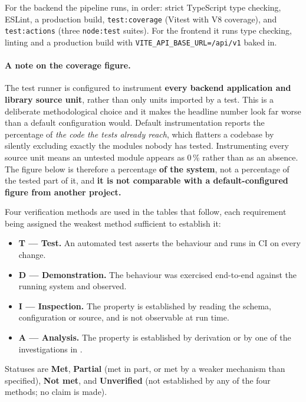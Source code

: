 For the backend the pipeline runs, in order: strict TypeScript type checking,
ESLint, a production build, \texttt{test:coverage} (Vitest with V8 coverage),
and \texttt{test:actions} (three \texttt{node:test} suites). For the frontend it
runs type checking, linting and a production build with
\nolinkurl{VITE_API_BASE_URL=/api/v1} baked in.

\paragraph{A note on the coverage figure.} The test runner is configured to
instrument \textbf{every backend application and library source unit}, rather
than only units imported by a test. This is a deliberate methodological choice
and it makes the headline number look far worse than a default configuration
would. Default instrumentation reports the percentage of \emph{the code the
tests already reach}, which flatters a codebase by silently excluding exactly
the modules nobody has tested. Instrumenting every source unit means an untested
module appears as 0\,\% rather than as an absence. The figure below is therefore
a percentage \textbf{of the system}, not a percentage of the tested part of it,
and \textbf{it is not comparable with a default-configured figure from another
project.}

Four verification methods are used in the tables that follow, each requirement
being assigned the weakest method sufficient to establish it:

\begin{itemize}
  \item \textbf{T --- Test.} An automated test asserts the behaviour and runs in
  CI on every change.
  \item \textbf{D --- Demonstration.} The behaviour was exercised end-to-end
  against the running system and observed.
  \item \textbf{I --- Inspection.} The property is established by reading the
  schema, configuration or source, and is not observable at run time.
  \item \textbf{A --- Analysis.} The property is established by derivation or by
  one of the investigations in .
\end{itemize}

Statuses are \textbf{Met}, \textbf{Partial} (met in part, or met by a weaker
mechanism than specified), \textbf{Not met}, and \textbf{Unverified} (not
established by any of the four methods; no claim is made).

